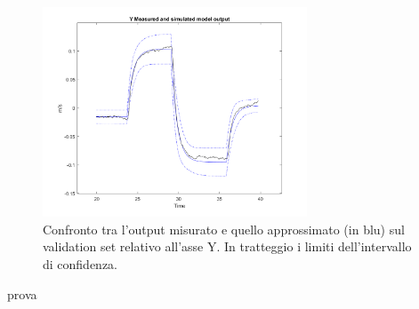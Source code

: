 \begin{figure}
    \centering
    \includegraphics[width=0.7\textwidth]{figs/chapter4/valytimeplot.png}
    \caption{Confronto tra l'output misurato e quello approssimato (in blu) sul validation set relativo all'asse Y. In tratteggio i limiti dell'intervallo di confidenza.}
    \label{fig:yvalerr}
\end{figure}

\indent prova

